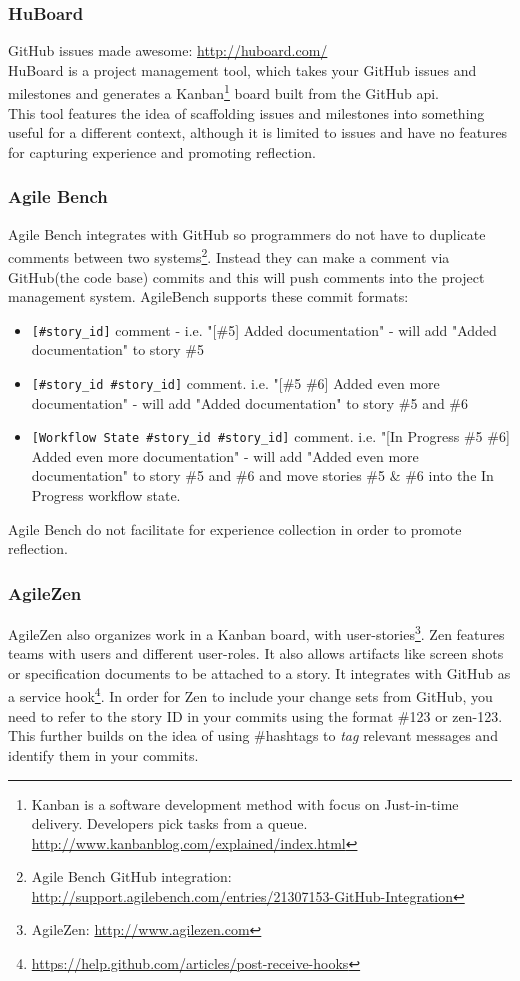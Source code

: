 \subsubsection{HuBoard}
GitHub issues made awesome: \url{http://huboard.com/} \\
HuBoard is a project management tool, which takes your GitHub issues and milestones and generates a Kanban\footnote{Kanban is a software development method with focus on Just-in-time delivery. Developers pick tasks from a queue. \url{http://www.kanbanblog.com/explained/index.html}} board built from the GitHub api. \\
This tool features the idea of scaffolding issues and milestones into something useful for a different context, although it is limited to issues and have no features for capturing experience and promoting reflection. 
\subsubsection*{Agile Bench}
Agile Bench integrates with GitHub so programmers do not have to duplicate comments between two systems\footnote{Agile Bench GitHub integration: \url{http://support.agilebench.com/entries/21307153-GitHub-Integration}}. Instead they can make a comment via GitHub(the code base) commits and this will push comments into the project management system. AgileBench supports these commit formats:
\begin{itemize}
\item \verb|[#story_id]| comment - i.e. "[\#5] Added documentation" - will add "Added documentation" to story \#5
\item \verb|[#story_id #story_id]| comment. i.e. "[\#5 \#6] Added even more documentation" - will add "Added documentation" to story \#5 and \#6
\item \verb|[Workflow State #story_id #story_id]| comment. i.e. "[In Progress \#5 \#6] Added even more documentation" - will add "Added even more documentation" to story \#5 and \#6 and move stories \#5 \& \#6 into the In Progress workflow state.
\end{itemize}
Agile Bench do not facilitate for experience collection in order to promote reflection.
\subsubsection*{AgileZen}
AgileZen also organizes work in a Kanban board, with user-stories\footnote{AgileZen: \url{http://www.agilezen.com}}. Zen features teams with users and different user-roles. It also allows artifacts like screen shots or specification documents to be attached to a story. It integrates with GitHub as a service hook\footnote{\url{https://help.github.com/articles/post-receive-hooks}}. In order for Zen to include your change sets from GitHub, you need to refer to the story ID in your commits using the format \#123 or zen-123. This further builds on the idea of using \#hashtags to \textit{tag} relevant messages and identify them in your commits. 